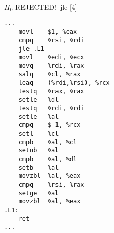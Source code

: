 \begin{figure}[H]
\begin{subfigure}[T]{0.30333333333333334\textwidth}
\begin{lrbox}{\mybox}
%
        \end{lrbox}\resizebox{\textwidth}{!}{\usebox{\mybox}}
\end{subfigure}
\begin{subfigure}[T]{0.30333333333333334\textwidth}
\caption*{}
\end{subfigure}
\begin{subfigure}[T]{0.30333333333333334\textwidth}
\caption*{}
\end{subfigure}
\hspace*{6mm}
\begin{subfigure}[T]{0.2733333333333333\textwidth}
\vspace*{2mm}\tiny {\color{red}$H_0$ REJECTED!}\ \vspace*{2mm}\tiny jle [4]
\begin{lstlisting}[style=defstyle,language={[x86masm]Assembler},basicstyle=\tiny\ttfamily,breaklines=true]
...
	movl	$1, %eax
	cmpq	%rsi, %rdi
	jle	.L1
	movl	%edi, %ecx
	movq	%rdi, %rax
	salq	%cl, %rax
	leaq	(%rdi,%rsi), %rcx
	testq	%rax, %rax
	setle	%dl
	testq	%rdi, %rdi
	setle	%al
	cmpq	$-1, %rcx
	setl	%cl
	cmpb	%al, %cl
	setnb	%al
	cmpb	%al, %dl
	setb	%al
	movzbl	%al, %eax
	cmpq	%rsi, %rax
	setge	%al
	movzbl	%al, %eax
.L1:
	ret
...\end{lstlisting}
\end{subfigure}
\end{figure}
\newpage\noindent